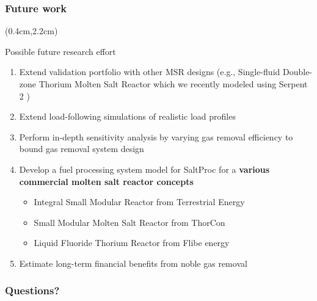 \begin{frame}
\frametitle{Future work}
\begin{textblock*}{12cm}(0.4cm,2.2cm) %
	\begin{block}{Possible future research effort}
		\begin{enumerate}
			\itemsep1em
			\item Extend validation portfolio with other MSR designs (e.g., 
			Single-fluid Double-zone Thorium Molten Salt Reactor which we 
			recently modeled using Serpent 2 \cite{ASHRAF2019107115})
			\item Extend load-following simulations of realistic load 
			profiles
			\item Perform in-depth sensitivity analysis by varying gas removal 
			efficiency to bound gas removal system design
			\item Develop a fuel processing system model for SaltProc
			for a \textbf{various commercial molten salt reactor concepts}
			\begin{itemize}
				\itemsep0.5em
				\item Integral Small Modular Reactor from Terrestrial Energy
				\item Small Modular Molten Salt Reactor from ThorCon
				\item Liquid Fluoride Thorium Reactor from Flibe
energy 
			\end{itemize}
			\item Estimate long-term financial benefits from noble gas removal
		\end{enumerate}
	\end{block}
\end{textblock*}
\end{frame}



\begin{frame}
	\frametitle{Questions?}
\end{frame}